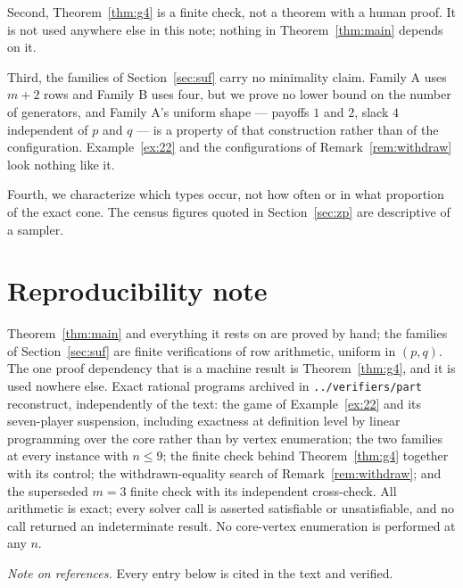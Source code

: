 \documentclass[11pt]{article}
\begin{document}
Second, Theorem~\ref{thm:g4} is a finite check, not a theorem with a human
proof.  It is not used anywhere else in this note; nothing in
Theorem~\ref{thm:main} depends on it.

Third, the families of Section~\ref{sec:suf} carry no minimality claim.
Family A uses $m+2$ rows and Family B uses four, but we prove no lower bound on
the number of generators, and Family A's uniform shape --- payoffs $1$ and $2$,
slack $4$ independent of $p$ and $q$ --- is a property of that construction
rather than of the configuration.  Example~\ref{ex:22} and the configurations of
Remark~\ref{rem:withdraw} look nothing like it.

Fourth, we characterize which types occur, not how often or in what
proportion of the exact cone.  The census figures quoted in
Section~\ref{sec:zp} are descriptive of a sampler.

\section*{Reproducibility note}

Theorem~\ref{thm:main} and everything it rests on are proved by hand; the
families of Section~\ref{sec:suf} are finite verifications of row arithmetic,
uniform in $(p,q)$.  The one proof dependency that is a machine result is
Theorem~\ref{thm:g4}, and it is used nowhere else.  Exact rational programs
archived in \texttt{../verifiers/part} reconstruct, independently of the text:
the game of Example~\ref{ex:22} and its seven-player suspension, including
exactness at definition level by linear programming over the core rather than
by vertex enumeration; the two families at every instance with $n\le9$; the
finite check behind Theorem~\ref{thm:g4} together with its control; the
withdrawn-equality search of Remark~\ref{rem:withdraw}; and the superseded
$m=3$ finite check with its independent cross-check.  All arithmetic is exact;
every solver call is asserted satisfiable or unsatisfiable, and no call
returned an indeterminate result.  No core-vertex enumeration is performed at
any $n$.


\noindent\emph{Note on references.}  Every entry below is cited in the text
and verified.
\end{document}

